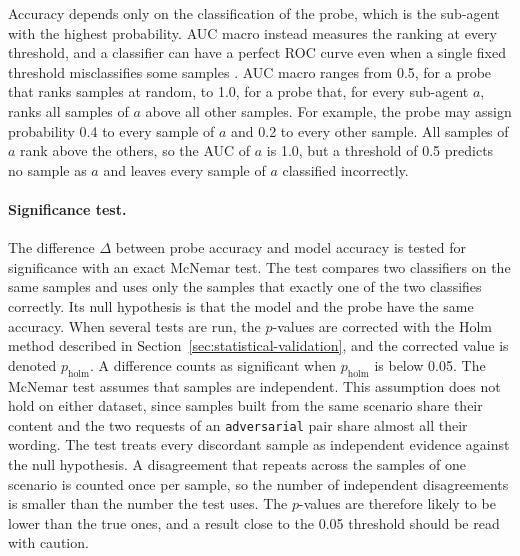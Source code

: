 Accuracy depends only on the classification of the probe, which is the sub-agent with the highest probability. AUC macro instead measures the ranking at every threshold, and a classifier can have a perfect ROC curve even when a single fixed threshold misclassifies some samples \cite{fawcettIntroductionROCAnalysis2006}. AUC macro ranges from 0.5, for a probe that ranks samples at random, to 1.0, for a probe that, for every sub-agent $a$, ranks all samples of $a$ above all other samples. For example, the probe may assign probability 0.4 to every sample of $a$ and 0.2 to every other sample. All samples of $a$ rank above the others, so the AUC of $a$ is 1.0, but a threshold of 0.5 predicts no sample as $a$ and leaves every sample of $a$ classified incorrectly.

\paragraph{Significance test.} The difference $\Delta$ between probe accuracy and model accuracy is tested for significance with an exact McNemar test. The test compares two classifiers on the same samples and uses only the samples that exactly one of the two classifies correctly. Its null hypothesis is that the model and the probe have the same accuracy. When several tests are run, the $p$-values are corrected with the Holm method described in Section~\ref{sec:statistical-validation}, and the corrected value is denoted $p_{\text{holm}}$. A difference counts as significant when $p_{\text{holm}}$ is below 0.05. The McNemar test assumes that samples are independent. This assumption does not hold on either dataset, since samples built from the same scenario share their content and the two requests of an \texttt{adversarial} pair share almost all their wording. The test treats every discordant sample as independent evidence against the null hypothesis. A disagreement that repeats across the samples of one scenario is counted once per sample, so the number of independent disagreements is smaller than the number the test uses. The $p$-values are therefore likely to be lower than the true ones, and a result close to the 0.05 threshold should be read with caution.
